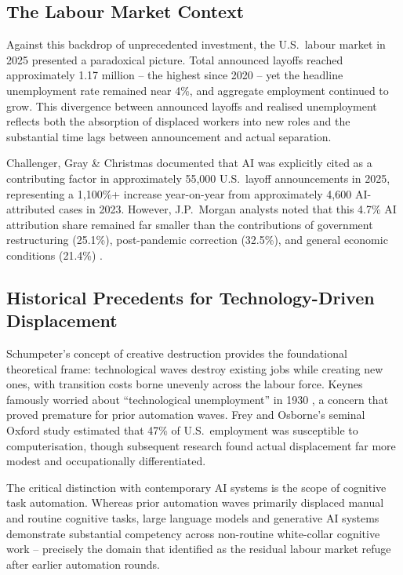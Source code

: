 \documentclass[12pt, a4paper]{article}
\begin{document}
\subsection{The Labour Market Context}

Against this backdrop of unprecedented investment, the U.S.\ labour market in 2025 presented
a paradoxical picture. Total announced layoffs reached approximately 1.17 million -- the
highest since 2020 -- yet the headline unemployment rate remained near 4\%, and aggregate
employment continued to grow. This divergence between announced layoffs and realised
unemployment reflects both the absorption of displaced workers into new roles and the
substantial time lags between announcement and actual separation.

Challenger, Gray \& Christmas \citep{challenger2025} documented that AI was explicitly cited
as a contributing factor in approximately 55,000 U.S.\ layoff announcements in 2025,
representing a 1,100\%+ increase year-on-year from approximately 4,600 AI-attributed
cases in 2023. However, J.P.~Morgan analysts noted that this 4.7\% AI attribution share
remained far smaller than the contributions of government restructuring (25.1\%),
post-pandemic correction (32.5\%), and general economic conditions (21.4\%)
\citep{jpmorgan2025}.

\subsection{Historical Precedents for Technology-Driven Displacement}

Schumpeter's concept of creative destruction \citep{schumpeter1942} provides the foundational
theoretical frame: technological waves destroy existing jobs while creating new ones, with
transition costs borne unevenly across the labour force. Keynes famously worried about
``technological unemployment'' in 1930 \citep{keynes1930}, a concern that proved
premature for prior automation waves. Frey and Osborne's \citeyearpar{frey2013} seminal
Oxford study estimated that 47\% of U.S.\ employment was susceptible to computerisation,
though subsequent research found actual displacement far more modest and
occupationally differentiated.

The critical distinction with contemporary AI systems is the scope of cognitive task
automation. Whereas prior automation waves primarily displaced manual and routine cognitive
tasks, large language models and generative AI systems demonstrate substantial competency
across non-routine white-collar cognitive work -- precisely the domain that \citet{acemoglu2019}
identified as the residual labour market refuge after earlier automation rounds.
\end{document}
